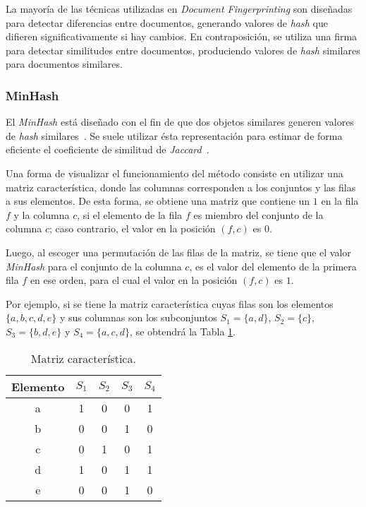 La mayoría de las técnicas utilizadas en \textit{Document Fingerprinting} 
son diseñadas para detectar diferencias entre documentos,
generando valores de \textit{hash} que difieren significativamente si hay cambios.
En contraposición, se utiliza una firma para detectar similitudes entre documentos,
produciendo valores de \textit{hash} similares para documentos similares.

\subsubsection{MinHash}

El \textit{MinHash} está diseñado con el fin de que dos objetos
similares generen valores de \textit{hash} similares~\cite{grattan_2017}.
Se suele utilizar ésta representación para estimar de forma eficiente
el coeficiente de similitud de \textit{Jaccard}~\cite{Rajaraman:2011:MMD:2124405}.

Una forma de visualizar el funcionamiento del método
consiste en utilizar una matriz característica,
donde las columnas corresponden a los conjuntos y
las filas a sus elementos.
De esta forma, se obtiene una matriz que contiene un $1$ en la fila $f$ y la columna $c$,
si el elemento de la fila $f$ es miembro del conjunto de la columna $c$;
caso contrario, el valor en la posición $(f,c)$ es $0$.

Luego, al escoger una permutación de las filas de la matriz, 
se tiene que el valor \textit{MinHash} para el conjunto de la columna $c$,
es el valor del elemento de la primera fila $f$ en ese orden,
para el cual el valor en la posición $(f,c)$ es $1$.

Por ejemplo, si se tiene la matriz característica cuyas filas son los elementos
$\{a,b,c,d,e\}$ y sus columnas son los subconjuntos $S_1 = \{a,d\}$,
$S_2 = \{c\}$, $S_3 = \{b,d,e\}$ y $S_4 = \{a,c,d\}$, se obtendrá la Tabla \ref{tab:conjuntoejemplo1}.

\begin{table}[h]
\caption{Matriz característica.}
\label{tab:conjuntoejemplo1}
\small
\centering
\begin{tabular}{ccccc}
\hline
{Elemento} & {$S_1$} & {$S_2$} & {$S_3$} & {$S_4$} \\
\hline
a & 1 & 0 & 0 & 1 \\
b & 0 & 0 & 1 & 0 \\
c & 0 & 1 & 0 & 1 \\
d & 1 & 0 & 1 & 1 \\
e & 0 & 0 & 1 & 0 \\
\hline
\end{tabular}
\end{table}

